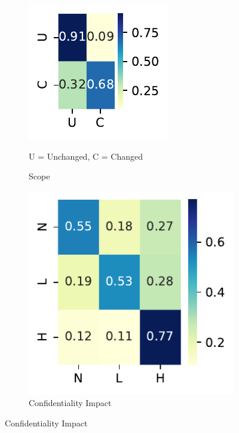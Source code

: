 \documentclass[12pt]{article}
\begin{document}
\begin{figure}
	\centering

	\vspace{1em}

	\begin{subfigure}[t]{0.45\textwidth}
		\includegraphics[width=\textwidth]{./figures/confusion_matrices/scope_nvd.pdf}
		\caption{Scope}

		\begin{tablenotes}
			\footnotesize
			\item \quad U = Unchanged, C = Changed
		\end{tablenotes}
	\end{subfigure}
	\hfill
	\begin{subfigure}[t]{0.45\textwidth}
		\includegraphics[width=\textwidth]{./figures/confusion_matrices/confidentiality_impact_nvd.pdf}
		\caption{Confidentiality Impact}


\end{subfigure}
\end{figure}
\end{document}
